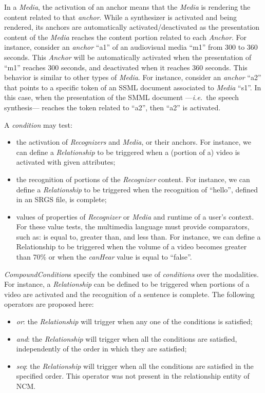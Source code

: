 In a \textit{Media}, the activation of an anchor means that the \textit{Media}
is rendering the content related to that \textit{anchor}. While a synthesizer is
activated and being rendered, its anchors are automatically
activated/deactivated as the presentation content of the \textit{Media} reaches
the content portion related to each
\textit{Anchor}. For instance, consider an \textit{anchor} “a1” of an
audiovisual media “m1” from 300 to 360 seconds. This \textit{Anchor} will be
automatically activated when the presentation of “m1” reaches 300 seconds, and
deactivated when it reaches 360 seconds. This behavior is similar to other types
of \textit{Media}. For instance, consider an \textit{anchor} “a2” that points to
a specific token of an SSML document associated to \textit{Media} “s1”. In
this case, when the presentation of the SMML document —\textit{i.e.}~the speech
synthesis— reaches the token related to “a2”, then “a2” is activated.

A \textit{condition} may test:

\begin{itemize}
	\item the activation of \textit{Recognizers} and \textit{Media}, or their
	anchors. For instance, we can define a \textit{Relationship} to be triggered
	when a (portion of a) video is activated with given attributes;
	\item the recognition of portions of the \textit{Recognizer} content. For
	instance, we can define a \textit{Relationship} to be triggered when the
	recognition of “hello”, defined in an SRGS file, is complete;
	\item values of properties of \textit{Recognizer} or \textit{Media} and
	runtime of a user’s context. For these value tests, the multimedia language
	must provide comparators, such as: is equal to, greater than, and less than.
	For instance, we can define a Relationship to be triggered when the volume of a video becomes greater than 70\% or when the \textit{canHear} value is equal to “false”.
\end{itemize}

\textit{CompoundCondition}s specify the combined use of \textit{conditions} over
the modalities. For instance, a \textit{Relationship} can be defined to be
triggered when portions of a video are activated and the recognition of a
sentence is complete. The following operators are proposed here:

\begin{itemize}
	\item \textit{or}: the \textit{Relationship} will trigger when any one of the
	conditions is satisfied;
	\item \textit{and}: the \textit{Relationship} will trigger when all the
	conditions are satisfied, independently of the order in which they are
	satisfied;
	\item \textit{seq}: the \textit{Relationship} will trigger when all the
	conditions are satisfied in the specified order. This operator was not present in the relationship entity of NCM.
\end{itemize}

